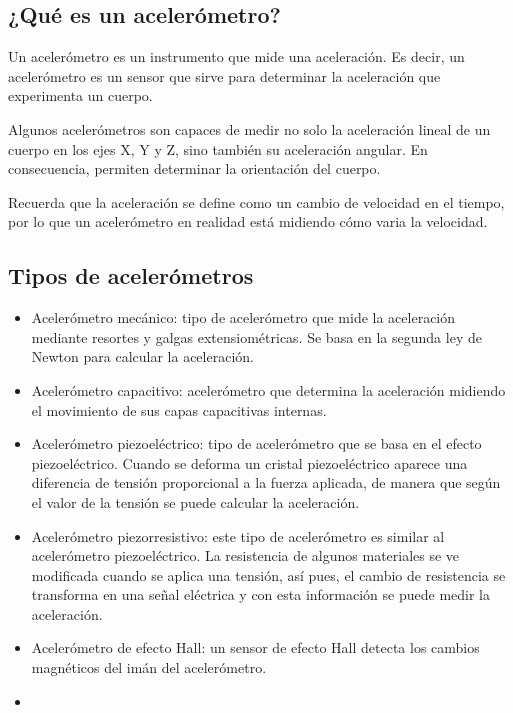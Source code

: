 \subsection{ ¿Qué es un acelerómetro?}

Un acelerómetro es un instrumento que mide una aceleración. Es decir, un acelerómetro es un sensor que sirve para determinar la aceleración que experimenta un cuerpo.

Algunos acelerómetros son capaces de medir no solo la aceleración lineal de un cuerpo en los ejes X, Y y Z, sino también su aceleración angular. En consecuencia, permiten determinar la orientación del cuerpo.

Recuerda que la aceleración se define como un cambio de velocidad en el tiempo, por lo que un acelerómetro en realidad está midiendo cómo varia la velocidad.



\subsection{ Tipos de acelerómetros}

\begin{itemize}
    \item Acelerómetro mecánico: tipo de acelerómetro que mide la aceleración mediante resortes y galgas extensiométricas. Se basa en la segunda ley de Newton para calcular la aceleración.
    \item Acelerómetro capacitivo: acelerómetro que determina la aceleración midiendo el movimiento de sus capas capacitivas internas.
    \item Acelerómetro piezoeléctrico: tipo de acelerómetro que se basa en el efecto piezoeléctrico. Cuando se deforma un cristal piezoeléctrico aparece una diferencia de tensión proporcional a la fuerza aplicada, de manera que según el valor de la tensión se puede calcular la aceleración.
    \item Acelerómetro piezorresistivo: este tipo de acelerómetro es similar al acelerómetro piezoeléctrico. La resistencia de algunos materiales se ve modificada cuando se aplica una tensión, así pues, el cambio de resistencia se transforma en una señal eléctrica y con esta información se puede medir la aceleración.
    \item Acelerómetro de efecto Hall: un sensor de efecto Hall detecta los cambios magnéticos del imán del acelerómetro.
    \item 
\end{itemize}

